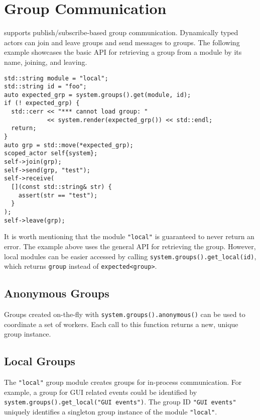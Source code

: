 \section{Group Communication}
\label{groups}

\lib supports publish/subscribe-based group communication. Dynamically typed actors can join and leave groups and send messages to groups. The following example showcases the basic API for retrieving a group from a module by its name, joining, and leaving.

\begin{lstlisting}
std::string module = "local";
std::string id = "foo";
auto expected_grp = system.groups().get(module, id);
if (! expected_grp) {
  std::cerr << "*** cannot load group: "
            << system.render(expected_grp()) << std::endl;
  return;
}
auto grp = std::move(*expected_grp);
scoped_actor self{system};
self->join(grp);
self->send(grp, "test");
self->receive(
  [](const std::string& str) {
    assert(str == "test");
  }
);
self->leave(grp);
\end{lstlisting}

It is worth mentioning that the module \lstinline`"local"` is guaranteed to never return an error. The example above uses the general API for retrieving the group. However, local modules can be easier accessed by calling \lstinline`system.groups().get_local(id)`, which returns \lstinline`group` instead of \lstinline`expected<group>`.

\subsection{Anonymous Groups}
\label{anonymous-group}

Groups created on-the-fly with \lstinline^system.groups().anonymous()^ can be used to coordinate a set of workers.
Each call to this function returns a new, unique group instance.

\subsection{Local Groups}
\label{local-group}

The \lstinline^"local"^ group module creates groups for in-process communication.
For example, a group for GUI related events could be identified by \lstinline^system.groups().get_local("GUI events")^.
The group ID \lstinline^"GUI events"^ uniquely identifies a singleton group instance of the module \lstinline^"local"^.

